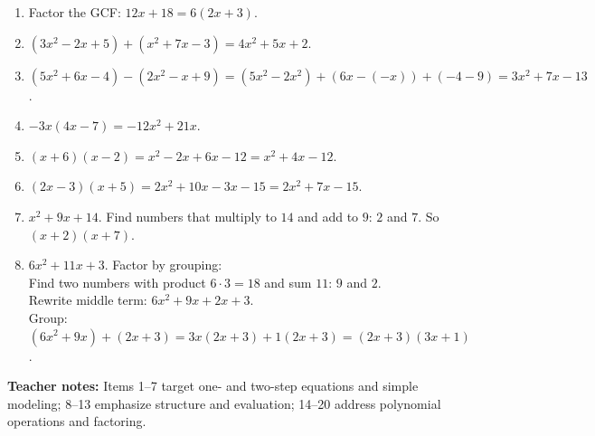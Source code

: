 \documentclass[11pt]{article}
\begin{document}
\begin{enumerate}
\item Factor the GCF: $12x + 18 = 6(2x + 3)$.

\item $(3x^2 - 2x + 5) + (x^2 + 7x - 3) = 4x^2 + 5x + 2$.

\item $(5x^2 + 6x - 4) - (2x^2 - x + 9) = (5x^2 - 2x^2) + (6x - (-x)) + (-4 - 9) = 3x^2 + 7x - 13$.

\item $-3x(4x - 7) = -12x^2 + 21x$.

\item $(x + 6)(x - 2) = x^2 - 2x + 6x - 12 = x^2 + 4x - 12$.

\item $(2x - 3)(x + 5) = 2x^2 + 10x - 3x - 15 = 2x^2 + 7x - 15$.

\item $x^2 + 9x + 14$. Find numbers that multiply to $14$ and add to $9$: $2$ and $7$. So $(x + 2)(x + 7)$.

\item $6x^2 + 11x + 3$. Factor by grouping:
\\ Find two numbers with product $6\cdot 3 = 18$ and sum $11$: $9$ and $2$. 
\\ Rewrite middle term: $6x^2 + 9x + 2x + 3$. 
\\ Group: $(6x^2 + 9x) + (2x + 3) = 3x(2x + 3) + 1(2x + 3) = (2x + 3)(3x + 1)$.
\end{enumerate}

\vfill
\hrulefill

\small
\textbf{Teacher notes:} Items 1--7 target one- and two-step equations and simple modeling; 8--13 emphasize structure and evaluation; 14--20 address polynomial operations and factoring.
\end{document}
